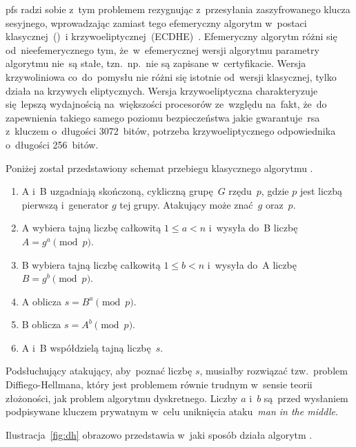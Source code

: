 \documentclass[thesis]{subfiles}
\begin{document}
\gls{pfs} radzi sobie z~tym problemem rezygnując z~przesyłania zaszyfrowanego klucza sesyjnego, wprowadzając zamiast tego efemeryczny algorytm  w~postaci klasycznej~()~i krzywoeliptycznej~(ECDHE)~\cite{mimuw-ssl-w04,openssl-cookbook-suites}. Efemeryczny algorytm  różni się od~nieefemerycznego tym, że~w~efemerycznej wersji algorytmu parametry algorytmu nie~są stałe, tzn.~np.~nie są zapisane w~certyfikacie. Wersja krzywoliniowa co~do~pomysłu nie różni się istotnie od~wersji klasycznej, tylko działa na krzywych eliptycznych. Wersja krzywoeliptyczna charakteryzuje się~lepszą wydajnością na~większości procesorów ze~względu na~fakt, że~do zapewnienia takiego samego poziomu bezpieczeństwa jakie gwarantuje~\gls{rsa} z~kluczem o~długości 3072~bitów, potrzeba krzywoeliptycznego odpowiednika o~długości 256~bitów.

Poniżej został przedstawiony schemat przebiegu klasycznego algorytmu .

\begin{enumerate}
\item A i~B uzgadniają skończoną, cykliczną grupę~$G$ rzędu~$p$, gdzie $p$ jest liczbą pierwszą i~generator $g$ tej grupy. Atakujący może znać~$g$ oraz~$p$.
\item A wybiera tajną liczbę całkowitą $1 \leq a < n$ i~wysyła do~B liczbę $A=g^a \pmod{p}$.
\item B wybiera tajną liczbę całkowitą $1 \leq b < n$ i~wysyła do~A liczbę $B=g^b \pmod{p}$.
\item A oblicza $s=B^a \pmod{p}$.
\item B oblicza $s=A^b \pmod{p}$.
\item A i~B współdzielą tajną liczbę~$s$.
\end{enumerate}

Podsłuchujący atakujący, aby~poznać liczbę $s$, musiałby rozwiązać tzw.~problem Diffiego-Hellmana, który jest problemem równie trudnym w~sensie teorii złożoności, jak problem algorytmu dyskretnego. Liczby $a$ i~$b$ są~przed wysłaniem podpisywane kluczem prywatnym w~celu uniknięcia ataku~\emph{man in the middle}.

Ilustracja~\ref{fig:dh} obrazowo przedstawia w~jaki sposób działa algorytm .
\end{document}
